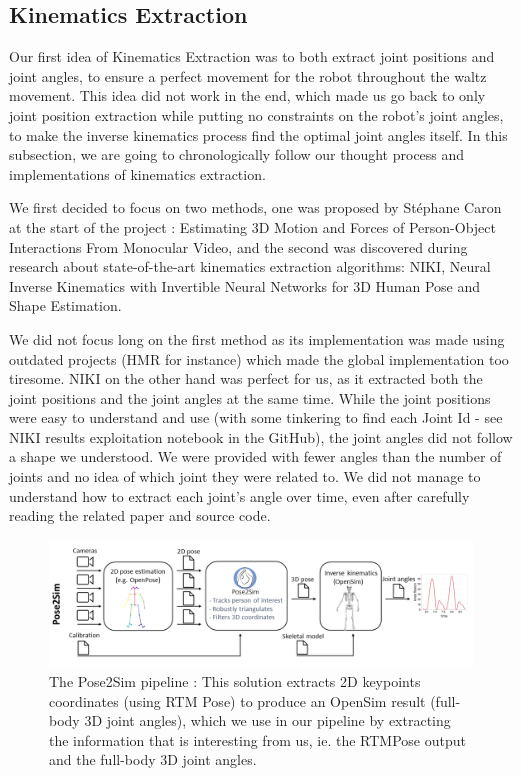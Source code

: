 \documentclass{amsart}
\theoremstyle{definition}
\theoremstyle{plain}
\begin{document}
\subsection{Kinematics Extraction}
Our first idea of Kinematics Extraction was to both extract joint positions and joint angles, to ensure a perfect movement for the robot throughout the waltz movement. This idea did not work in the end, which made us go back to only joint position extraction while putting no constraints on the robot's joint angles, to make the inverse kinematics process find the optimal joint angles itself. In this subsection, we are going to chronologically follow our thought process and implementations of kinematics extraction.

We first decided to focus on two methods, one was proposed by Stéphane Caron at the start of the project : Estimating 3D Motion and Forces of Person-Object Interactions From Monocular Video\cite{Li_2019}, and the second was discovered during research about state-of-the-art kinematics extraction algorithms: NIKI, Neural Inverse Kinematics with Invertible Neural Networks for 3D Human Pose and Shape Estimation\cite{li2023niki}.

We did not focus long on the first method as its implementation was made using outdated projects (HMR for instance) which made the global implementation too tiresome. NIKI on the other hand was perfect for us, as it extracted both the joint positions and the joint angles at the same time. While the joint positions were easy to understand and use (with some tinkering to find each Joint Id - see NIKI results exploitation notebook in the GitHub), the joint angles did not follow a shape we understood. We were provided with fewer angles than the number of joints and no idea of which joint they were related to. We did not manage to understand how to extract each joint's angle over time, even after carefully reading the related paper and source code. 

\begin{figure}
  \includegraphics[width = 0.99 \columnwidth]{img/pose2sim_pipeline.png}
  \caption{The Pose2Sim pipeline : This solution extracts 2D keypoints coordinates (using RTM Pose\cite{RTMPose}) to produce an OpenSim result (full-body 3D joint angles), which we use in our pipeline by extracting the information that is interesting from us, ie. the RTMPose output and the full-body 3D joint angles.}\label{fig:pose2sim_pipeline}
\end{figure}
\end{document}
